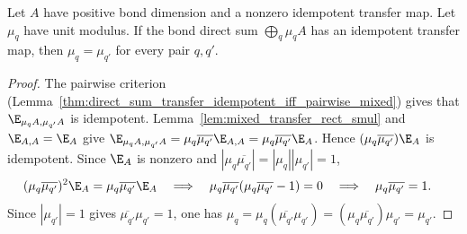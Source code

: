 \begin{lemma}%
    \label{thm:literal_repeated_blocks_phase_coherence}
    \leanok
    Let $A$ have positive bond dimension and a nonzero idempotent transfer map.
    Let $\mu_q$ have unit modulus. If the bond direct sum
    $\bigoplus_q \mu_qA$ has an idempotent transfer map, then
    $\mu_q=\mu_{q'}$ for every pair $q,q'$.
\end{lemma}
\begin{proof}\leanok
    The pairwise criterion
    (Lemma~\ref{thm:direct_sum_transfer_idempotent_iff_pairwise_mixed})
    gives that $\E_{\mu_qA,\mu_{q'}A}$ is idempotent.
    Lemma~\ref{lem:mixed_transfer_rect_smul} and
    $\E_{A,A}=\E_A$ give
    $\E_{\mu_qA,\mu_{q'}A}
        =\mu_q\overline{\mu_{q'}}\E_{A,A}
        =\mu_q\overline{\mu_{q'}}\E_A$.
    Hence $(\mu_q\overline{\mu_{q'}})\E_A$ is idempotent. Since $\E_A$ is
    nonzero and
    $|\mu_q\overline{\mu_{q'}}|=|\mu_q||\mu_{q'}|=1$,
    \begin{align}
        (\mu_q\overline{\mu_{q'}})^2\E_A
        =\mu_q\overline{\mu_{q'}}\E_A
         & \quad\Longrightarrow\quad
        \mu_q\overline{\mu_{q'}}
        (\mu_q\overline{\mu_{q'}}-1)=0
        \quad\Longrightarrow\quad
        \mu_q\overline{\mu_{q'}}=1.
        \notag
    \end{align}
    Since $|\mu_{q'}|=1$ gives
    $\overline{\mu_{q'}}\mu_{q'}=1$, one has
    $\mu_q
        =\mu_q(\overline{\mu_{q'}}\mu_{q'})
        =(\mu_q\overline{\mu_{q'}})\mu_{q'}
        =\mu_{q'}$.

\end{proof}

